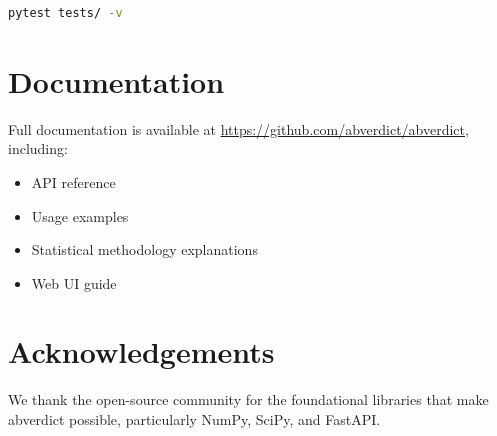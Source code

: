\documentclass[10pt,a4paper]{article}
\begin{document}
\begin{lstlisting}[language=bash, caption=Running tests]
pytest tests/ -v
\end{lstlisting}

\section*{Documentation}

Full documentation is available at \url{https://github.com/abverdict/abverdict}, including:

\begin{itemize}
    \item API reference
    \item Usage examples
    \item Statistical methodology explanations
    \item Web UI guide
\end{itemize}

\section*{Acknowledgements}

We thank the open-source community for the foundational libraries that make abverdict possible, particularly NumPy, SciPy, and FastAPI.



\end{document}
